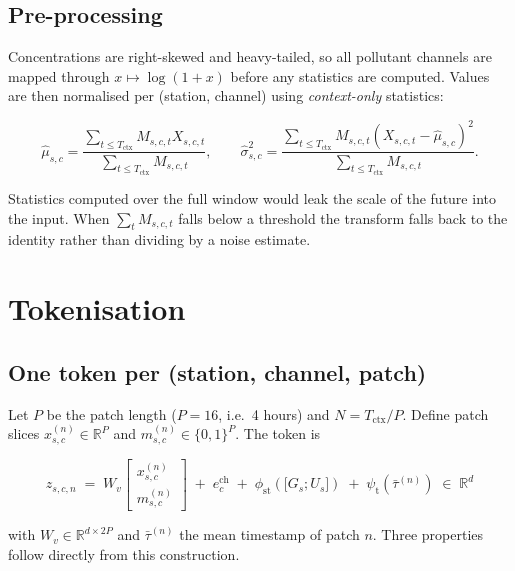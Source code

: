 \documentclass[11pt,a4paper]{article}
\newcommand{\R}{\mathbb{R}}
\begin{document}
\subsection{Pre-processing}
\label{sec:preproc}

Concentrations are right-skewed and heavy-tailed, so all pollutant channels are
mapped through $x\mapsto\log(1+x)$ before any statistics are computed. Values
are then normalised per (station, channel) using \emph{context-only} statistics:

\begin{equation}
\hat\mu_{s,c}=\frac{\sum_{t\le T_{\text{ctx}}} M_{s,c,t}X_{s,c,t}}{\sum_{t\le T_{\text{ctx}}} M_{s,c,t}},
\qquad
\hat\sigma_{s,c}^2=\frac{\sum_{t\le T_{\text{ctx}}} M_{s,c,t}(X_{s,c,t}-\hat\mu_{s,c})^2}{\sum_{t\le T_{\text{ctx}}} M_{s,c,t}} .
\end{equation}

Statistics computed over the full window would leak the scale of the future into
the input. When $\sum_t M_{s,c,t}$ falls below a threshold the transform falls
back to the identity rather than dividing by a noise estimate.

\section{Tokenisation}

\subsection{One token per (station, channel, patch)}

Let $P$ be the patch length ($P=16$, i.e.\ 4 hours) and $N=T_{\text{ctx}}/P$.
Define patch slices $x^{(n)}_{s,c}\in\R^{P}$ and $m^{(n)}_{s,c}\in\{0,1\}^{P}$.
The token is

\begin{equation}
\boxed{\;
z_{s,c,n} \;=\; W_{v}\begin{bmatrix} x^{(n)}_{s,c} \\ m^{(n)}_{s,c}\end{bmatrix}
\;+\; e^{\text{ch}}_{c}
\;+\; \phi_{\text{st}}\!\left(\big[G_{s};U_{s}\big]\right)
\;+\; \psi_{\text{t}}\!\left(\bar\tau^{(n)}\right)
\;\in\;\R^{d}\;}
\label{eq:token}
\end{equation}

with $W_v\in\R^{d\times 2P}$ and $\bar\tau^{(n)}$ the mean timestamp of patch $n$.
Three properties follow directly from this construction.
\end{document}
